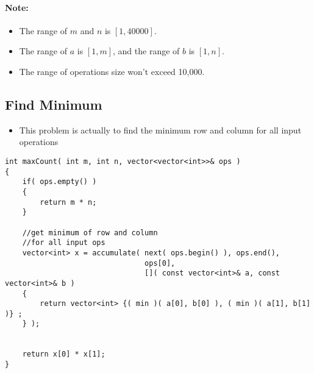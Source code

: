 \paragraph{Note:}
\begin{itemize}
\item The range of $m$ and $n$ is $[1,40000]$.
\item The range of $a$ is $[1,m]$, and the range of $b$ is $[1,n]$.
\item The range of operations size won't exceed 10,000.
\end{itemize}

\subsection{Find Minimum}
\begin{itemize}
\item This problem is actually  to find the minimum row and column for all input operations
\end{itemize}

\setcounter{lstlisting}{0}
\begin{lstlisting}[style=customc, caption={Find Minimum}]
int maxCount( int m, int n, vector<vector<int>>& ops )
{
    if( ops.empty() )
    {
        return m * n;
    }

    //get minimum of row and column
    //for all input ops
    vector<int> x = accumulate( next( ops.begin() ), ops.end(),
                                ops[0],
                                []( const vector<int>& a, const vector<int>& b )
    {
        return vector<int> {( min )( a[0], b[0] ), ( min )( a[1], b[1] )} ;
    } );


    return x[0] * x[1];
}
\end{lstlisting}